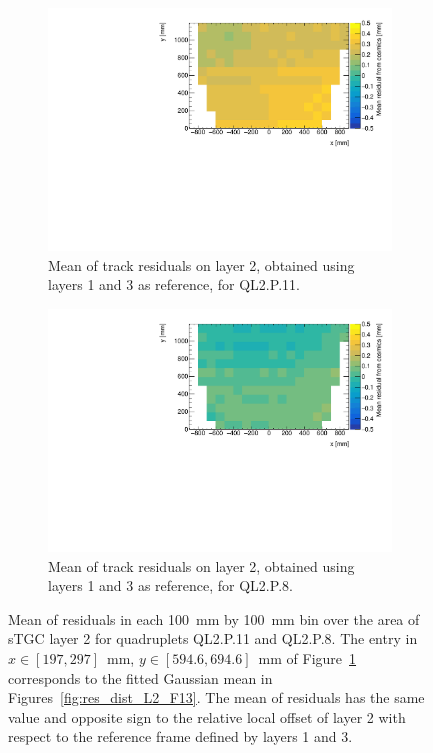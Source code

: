 \newpage
\thispagestyle{empty}
\begin{figure}
\centering
\begin{subfigure}{\textwidth}
  \centering
  \includegraphics[width=\linewidth]{figures/figure_QL2P11_3100V_2021-08-05_th2_means_layer2_fixedlayers13.pdf}
  \caption{Mean of track residuals on layer 2, obtained using layers 1 and 3 as reference, for QL2.P.11.}
  \label{fig:res_mean_th2_ql2p11}
\end{subfigure}%
\vspace*{\floatsep}
\begin{subfigure}{\textwidth}
  \centering
  \includegraphics[width=\linewidth]{figures/figure_QL2P08_3100V_2021-08-03_th2_means_layer2_fixedlayers13.pdf}
  \caption{Mean of track residuals on layer 2, obtained using layers 1 and 3 as reference, for QL2.P.8.}
  \label{fig:res_mean_th2_ql2p8}
\end{subfigure}
\caption{Mean of residuals in each \SI{100}{\milli\meter} by \SI{100}{\milli\meter} bin over the area of sTGC layer 2 for quadruplets QL2.P.11 and QL2.P.8. The entry in $x\in\left[197, 297\right]$~mm,  $y\in\left[594.6, 694.6\right]$~mm of Figure~\ref{fig:res_mean_th2_ql2p11} corresponds to the fitted Gaussian mean in Figures~\ref{fig:res_dist_L2_F13}. The mean of residuals has the same value and opposite sign to the relative local offset of layer 2 with respect to the reference frame defined by layers 1 and 3.}
\label{fig:res_mean_th2}
\end{figure}
